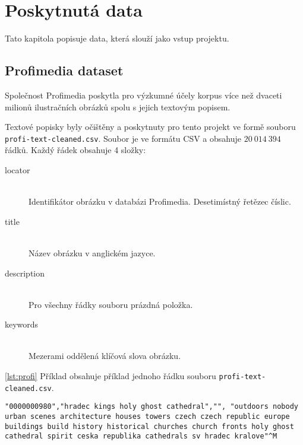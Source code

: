 \chapter{Poskytnutá data}

Tato kapitola popisuje data, která slouží jako vstup projektu.

\section{Profimedia dataset}

Společnost Profimedia poskytla pro výzkumné účely korpus více než dvaceti milionů ilustračních obrázků spolu s jejich textovým popisem.

Textové popisky byly očištěny\cite{brno} a poskytnuty pro tento projekt ve formě souboru \lstinline{profi-text-cleaned.csv}. Soubor je ve formátu CSV a obsahuje $20\ 014\ 394$ řádků. Každý řádek obsahuje 4 složky:

\begin{description}

\item[locator] \hfill \\
  Identifikátor obrázku v databázi Profimedia. Desetimístný řetězec číslic.

\item[title] \hfill \\
  Název obrázku v anglickém jazyce.

\item[description] \hfill \\
  Pro všechny řádky souboru prázdná položka.

\item[keywords] \hfill \\
  Mezerami oddělená klíčová slova obrázku.

\end{description}

\autoref{lst:profi} Příklad obsahuje příklad jednoho řádku souboru \lstinline{profi-text-cleaned.csv}.

\begin{lstlisting}[caption={Řádek souboru profi-text-cleaned.csv},label={lst:profi}]
"0000000980","hradec kings holy ghost cathedral","", "outdoors nobody urban scenes architecture houses towers czech czech republic europe buildings build history historical churches church fronts holy ghost cathedral spirit ceska republika cathedrals sv hradec kralove"^M
\end{lstlisting}

